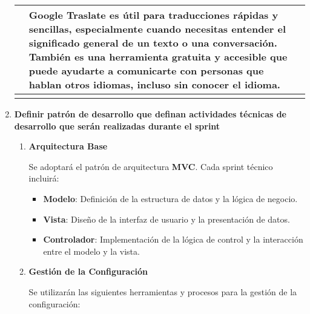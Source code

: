\begin{doublespace}
\begin{enumerate}[label=\alph*)]
\begin{longtable}{|p{3cm}|p{6cm}|p{6cm}|}
\begin{itemize}
 

    \end{itemize} & 
    Google Traslate es útil para traducciones rápidas y sencillas, especialmente cuando necesitas entender 
    el significado general de un texto o una conversación. También es una 
    herramienta gratuita y accesible que puede ayudarte a comunicarte con personas que hablan otros idiomas, 
    incluso sin conocer el idioma.\\
    \hline

            \hline
            \rowcolor{bleudefrance} \multicolumn{3}{c|}{} \\
            \hline
            
            \end{longtable}               

\newpage

    \item \large\textbf{Definir patrón de desarrollo que definan actividades técnicas de desarrollo que serán realizadas
    durante el sprint}
    
    \begin{enumerate}
        
        \item \textbf {Arquitectura Base}\par
        Se adoptará el patrón de arquitectura \textbf{MVC}. Cada sprint técnico incluirá:
        \begin{itemize}
            \item \textbf{Modelo}: Definición de la estructura de datos y la lógica de negocio.
            \item \textbf{Vista}: Diseño de la interfaz de usuario y la presentación de datos.
            \item \textbf{Controlador}: Implementación de la lógica de control y la interacción entre el modelo y la vista.
        \end{itemize}

        \item \textbf{Gestión de la Configuración}\par
        Se utilizarán las siguientes herramientas y procesos para la gestión de la configuración:


\end{enumerate}
\end{enumerate}
\end{doublespace}
